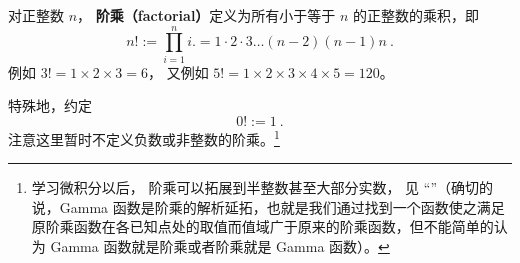 
\begin{issues}
\issueDraft
\end{issues}


对正整数 $n$， \textbf{阶乘（factorial）}定义为所有小于等于 $n$ 的正整数的乘积，即
\begin{equation}
n! := \prod_{i = 1}^n i. =1 \cdot 2 \cdot 3 \dots (n - 2) (n - 1)n~.
\end{equation}
例如 $3! = 1\times 2\times 3 = 6$， 又例如 $5! = 1\times 2\times 3\times 4\times 5 = 120$。

特殊地，约定
\begin{equation}
0! := 1~.
\end{equation}
注意这里暂时不定义负数或非整数的阶乘。\footnote{学习微积分以后， 阶乘可以拓展到半整数甚至大部分实数， 见 “”（确切的说，Gamma 函数是阶乘的解析延拓，也就是我们通过找到一个函数使之满足原阶乘函数在各已知点处的取值而值域广于原来的阶乘函数，但不能简单的认为 Gamma 函数就是阶乘或者阶乘就是 Gamma 函数）。}

